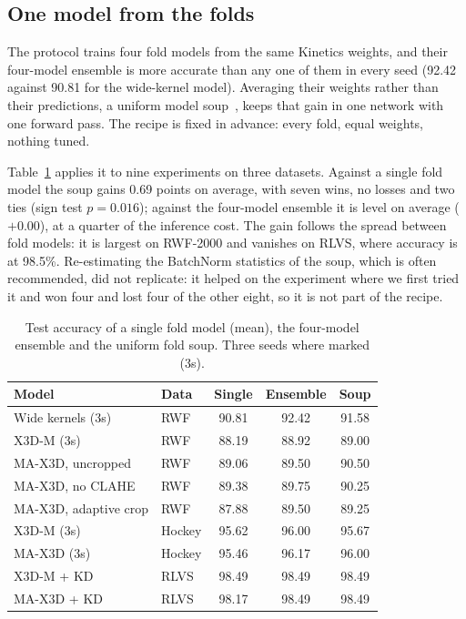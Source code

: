 \documentclass[conference]{IEEEtran}
\begin{document}
\subsection{One model from the folds}
\label{sec:soup}

The protocol trains four fold models from the same Kinetics weights, and
their four-model ensemble is more accurate than any one of them in every
seed (92.42 against 90.81 for the wide-kernel model). Averaging their
weights rather than their predictions, a uniform model soup~\cite{soup},
keeps that gain in one network with one forward pass. The recipe is fixed
in advance: every fold, equal weights, nothing tuned.

Table~\ref{tab:soup} applies it to nine experiments on three datasets.
Against a single fold model the soup gains 0.69 points on average, with
seven wins, no losses and two ties (sign test $p=0.016$); against the
four-model ensemble it is level on average ($+0.00$), at a quarter of the
inference cost. The gain follows the spread between fold models: it is
largest on RWF-2000 and vanishes on RLVS, where accuracy is at 98.5\%.
Re-estimating the BatchNorm statistics of the soup, which is often
recommended, did not replicate: it helped on the experiment where we first
tried it and won four and lost four of the other eight, so it is not part
of the recipe.

\begin{table}[t]
  \centering
  \caption{Test accuracy of a single fold model (mean), the four-model
  ensemble and the uniform fold soup. Three seeds where marked (3s).}
  \label{tab:soup}
  \setlength{\tabcolsep}{2.5pt}
  \begin{tabular}{llccc}
    \toprule
    Model & Data & Single & Ensemble & Soup \\
    \midrule
    Wide kernels (3s)      & RWF    & 90.81 & 92.42 & 91.58 \\
    X3D-M (3s)             & RWF    & 88.19 & 88.92 & 89.00 \\
    MA-X3D, uncropped      & RWF    & 89.06 & 89.50 & 90.50 \\
    MA-X3D, no CLAHE       & RWF    & 89.38 & 89.75 & 90.25 \\
    MA-X3D, adaptive crop  & RWF    & 87.88 & 89.50 & 89.25 \\
    X3D-M (3s)             & Hockey & 95.62 & 96.00 & 95.67 \\
    MA-X3D (3s)            & Hockey & 95.46 & 96.17 & 96.00 \\
    X3D-M + KD             & RLVS   & 98.49 & 98.49 & 98.49 \\
    MA-X3D + KD            & RLVS   & 98.17 & 98.49 & 98.49 \\
    \bottomrule
  \end{tabular}
\end{table}
\end{document}
